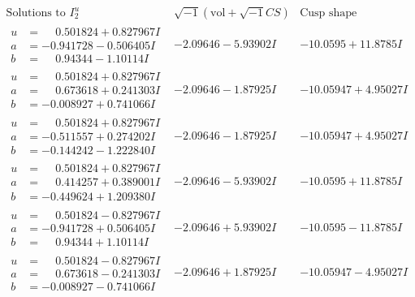 \documentclass[1p]{elsarticle_modified}
\theoremstyle{definition}
\newcommand{\I}{\sqrt{-1}}
\begin{document}
$$\begin{array}{c|c|c}  
\text{Solutions to }I^u_{2}& \I (\text{vol} + \sqrt{-1}CS) & \text{Cusp shape}\\
 \hline 
\begin{aligned}
u &= \phantom{-}0.501824 + 0.827967 I \\
a &= -0.941728 - 0.506405 I \\
b &= \phantom{-}0.94344 - 1.10114 I\end{aligned}
 & -2.09646 - 5.93902 I & -10.0595 + 11.8785 I \\ \hline\begin{aligned}
u &= \phantom{-}0.501824 + 0.827967 I \\
a &= \phantom{-}0.673618 + 0.241303 I \\
b &= -0.008927 + 0.741066 I\end{aligned}
 & -2.09646 - 1.87925 I & -10.05947 + 4.95027 I \\ \hline\begin{aligned}
u &= \phantom{-}0.501824 + 0.827967 I \\
a &= -0.511557 + 0.274202 I \\
b &= -0.144242 - 1.222840 I\end{aligned}
 & -2.09646 - 1.87925 I & -10.05947 + 4.95027 I \\ \hline\begin{aligned}
u &= \phantom{-}0.501824 + 0.827967 I \\
a &= \phantom{-}0.414257 + 0.389001 I \\
b &= -0.449624 + 1.209380 I\end{aligned}
 & -2.09646 - 5.93902 I & -10.0595 + 11.8785 I \\ \hline\begin{aligned}
u &= \phantom{-}0.501824 - 0.827967 I \\
a &= -0.941728 + 0.506405 I \\
b &= \phantom{-}0.94344 + 1.10114 I\end{aligned}
 & -2.09646 + 5.93902 I & -10.0595 - 11.8785 I \\ \hline\begin{aligned}
u &= \phantom{-}0.501824 - 0.827967 I \\
a &= \phantom{-}0.673618 - 0.241303 I \\
b &= -0.008927 - 0.741066 I\end{aligned}
 & -2.09646 + 1.87925 I & -10.05947 - 4.95027 I \\ \hline\begin{aligned}

\end{aligned}
\end{array}$$
\end{document}

